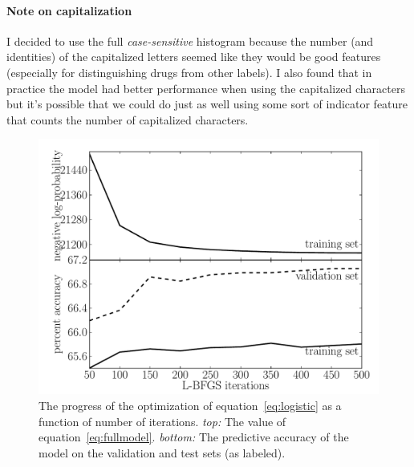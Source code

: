 \documentclass[11pt]{article}
\newcommand{\figlabel}[1]{\label{fig:#1}}
\newcommand{\code}[1]{{\sffamily #1}}
\begin{document}
\paragraph{Note on capitalization}
I decided to use the full \emph{case-sensitive} histogram because the number
(and identities) of the capitalized letters seemed like they would be good
features (especially for distinguishing \code{drug}s from other labels).
I also found that in practice the model had better performance when using the
capitalized characters but it's possible that we could do just as well using
some sort of indicator feature that counts the number of capitalized
characters.

\begin{figure}[htbp]
\begin{center}
    \includegraphics[width=\textwidth]{unigram_convergence.pdf}
\end{center}
\caption{%
The progress of the optimization of equation~\ref{eq:logistic} as a function
of number of iterations.
\emph{top:} The value of equation~\ref{eq:fullmodel}.
\emph{bottom:} The predictive accuracy of the model on the validation and test
sets (as labeled).
\figlabel{unigram-convergence}}
\end{figure}
\end{document}
